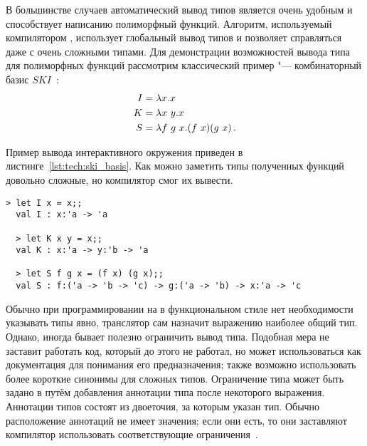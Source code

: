 В большинстве случаев автоматический вывод типов является очень удобным и способствует написанию полиморфный функций.
Алгоритм, используемый компилятором \fsharp{}, использует глобальный вывод типов и позволяет справляться даже с очень сложными типами.
Для демонстрации возможностей вывода типа для полиморфных функций рассмотрим классический пример "--- комбинаторный базис $SKI$~\cite[c.~21]{harrison_1997}:
\begin{align}
  I &= \lambda x . x \\
  K &= \lambda x\ y . x \\
  S &= \lambda f\ g\ x . (f\ x)(g\ x) \text{\,.}
\end{align}

Пример вывода интерактивного окружения \fsharp{} приведен в листинге~\ref{lst:tech:ski_basis}. 
Как можно заметить типы полученных функций довольно сложные, но компилятор смог их вывести.
  \begin{lstlisting}[style=fsharpstyle,caption={Пример определения комбинаторного базиса $SKI$}, label=lst:tech:ski_basis]
  > let I x = x;;
  val I : x:'a -> 'a

  > let K x y = x;;
  val K : x:'a -> y:'b -> 'a

  > let S f g x = (f x) (g x);;
  val S : f:('a -> 'b -> 'c) -> g:('a -> 'b) -> x:'a -> 'c
  \end{lstlisting}


Обычно при программировании на \fsharp{} в функциональном стиле нет необходимости указывать типы явно, транслятор сам назначит выражению наиболее общий тип.
Однако, иногда бывает полезно ограничить вывод типа. 
Подобная мера не заставит работать код, который до этого не работал, но может использоваться как документация для понимания его предназначения; также возможно использовать более короткие синонимы для сложных типов.
Ограничение типа может быть задано в \fsharp{} путём добавления аннотации типа после некоторого выражения. 
Аннотации типов состоят из двоеточия, за которым указан тип. 
Обычно расположение аннотаций не имеет значения; если они есть, то они заставляют компилятор использовать соответствующие ограничения~\cite[с.~59]{harrison_1997}. 


